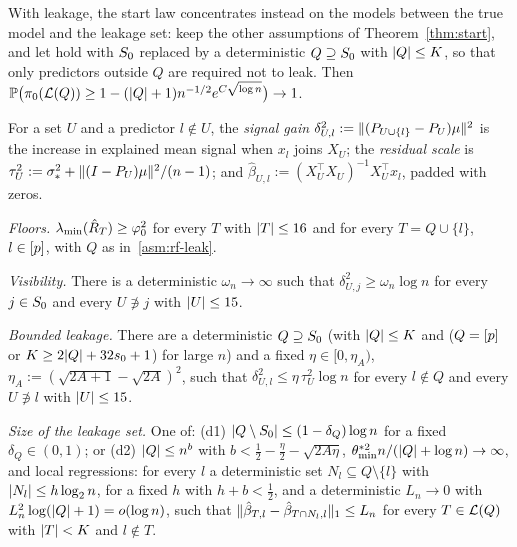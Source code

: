 
With leakage, the start law concentrates instead on the models between the true model and the leakage set: keep the
other assumptions of Theorem~\ref{thm:start}, and let  hold with $S_0$ replaced by a deterministic $Q\supseteq S_0$ with $\lvert Q\rvert\le K$, so
that only predictors outside $Q$ are required not to leak. Then $\mathbb{P}\big(\pi_0(\mathcal L(Q))\ge1-(\lvert Q\rvert+1)n^{-1/2}e^{C\sqrt{\log n}}\big)\to1$.


For a set $U$ and a predictor $l\notin U$, the \emph{signal gain} $\delta^2_{U,l}:=\lVert (P_{U\cup\{l\}}-P_U)\mu\rVert^2$ is the
increase in explained mean signal when $x_l$ joins $X_U$; the \emph{residual scale} is $\tau^2_U:=\sigma_*^2+\lVert (I-P_U)\mu\rVert^2/(n-1)$;
and $\hat\beta_{U,l}:=(X_U^\top X_U)^{-1}X_U^\top x_l$, padded with zeros.

\begin{localassumption}\label{asm:reported-fixed}
\begin{asmitems}
  \item\label{asm:rf-floor} \emph{Floors.} $\lambda_{\min}(\hat R_T)\ge\varphi_0^2$ for every $T$ with $\lvert T\rvert\le16$ and for every
    $T=Q\cup\{l\}$, $l\in[p]$, with $Q$ as in~\ref{asm:rf-leak}.
  \item\label{asm:rf-vis} \emph{Visibility.} There is a deterministic $\omega_n\to\infty$ such that
    $\delta^2_{U,j}\ge\omega_n\log n$ for every $j\in S_0$ and every $U\not\ni j$ with $\lvert U\rvert\le15$.
  \item\label{asm:rf-leak} \emph{Bounded leakage.} There are a deterministic $Q\supseteq S_0$ (with $\lvert Q\rvert\le K$ and
    ($Q=[p]$ or $K\ge2\lvert Q\rvert+32s_0+1$) for large $n$) and a fixed $\eta\in[0,\eta_A)$,
    $\eta_A:=(\sqrt{2A+1}-\sqrt{2A})^2$, such that $\delta^2_{U,l}\le\eta\,\tau^2_U\log n$ for every $l\notin Q$ and every
    $U\not\ni l$ with $\lvert U\rvert\le15$.
  \item\label{asm:rf-size} \emph{Size of the leakage set.} One of: (d1) $\lvert Q\setminus S_0\rvert\le(1-\delta_Q)\log n$ for a
    fixed $\delta_Q\in(0,1)$; or (d2) $\lvert Q\rvert\le n^b$ with $b<\tfrac12-\tfrac\eta2-\sqrt{2A\eta}$,
    $\theta^{*2}_{\min}n/(\lvert Q\rvert+\log n)\to\infty$, and local regressions: for every $l$ a deterministic set
    $N_l\subseteq Q\setminus\{l\}$ with $\lvert N_l\rvert\le h\log_2n$, for a fixed $h$ with $h+b<\tfrac12$, and a deterministic $L_n\to0$ with
    $L_n^2\log(\lvert Q\rvert+1)=o(\log n)$, such that $\lVert \hat\beta_{T,l}-\hat\beta_{T\cap N_l,l}\rVert_1\le L_n$ for every
    $T\in\mathcal L(Q)$ with $\lvert T\rvert<K$ and $l\notin T$.
\end{asmitems}
\end{localassumption}

